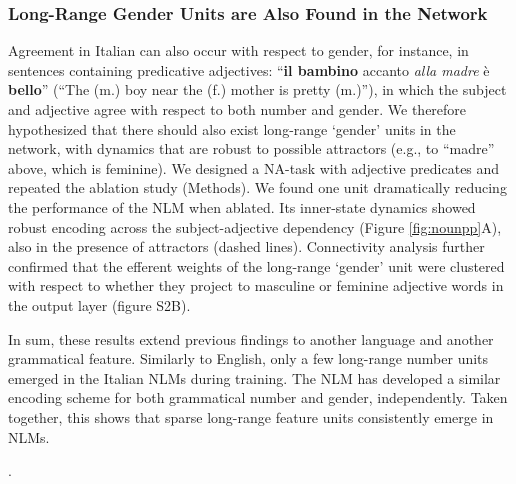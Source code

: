 \subsubsection{Long-Range Gender Units are Also Found in the Network }
Agreement in Italian can also occur with respect to gender, for instance, in sentences containing predicative adjectives: ``\textbf{il bambino} accanto \emph{alla madre} \`{e} \textbf{bello}'' (``The (m.) boy near the (f.) mother is pretty (m.)''), in which the subject and adjective agree with respect to both number and gender. We therefore hypothesized that there should also exist long-range `gender' units in the network, with dynamics that are robust to possible attractors (e.g., to ``madre'' above, which is feminine). We designed a NA-task with adjective predicates and repeated the ablation study (Methods). We found one unit dramatically reducing the performance of the NLM when ablated. Its inner-state dynamics showed robust encoding across the subject-adjective dependency (Figure \ref{fig:nounpp}A), also in the presence of attractors (dashed lines). Connectivity analysis further confirmed that the efferent weights of the long-range `gender' unit were clustered with respect to whether they project to masculine or feminine adjective words in the output layer (figure S2B).

\vspace{10pt}
In sum, these results extend previous findings to another language and another grammatical feature. Similarly to English, only a few long-range number units emerged in the Italian NLMs during training. The NLM has developed a similar encoding scheme for both grammatical number and gender, independently. Taken together, this shows that sparse long-range feature units consistently emerge in NLMs.

. 

